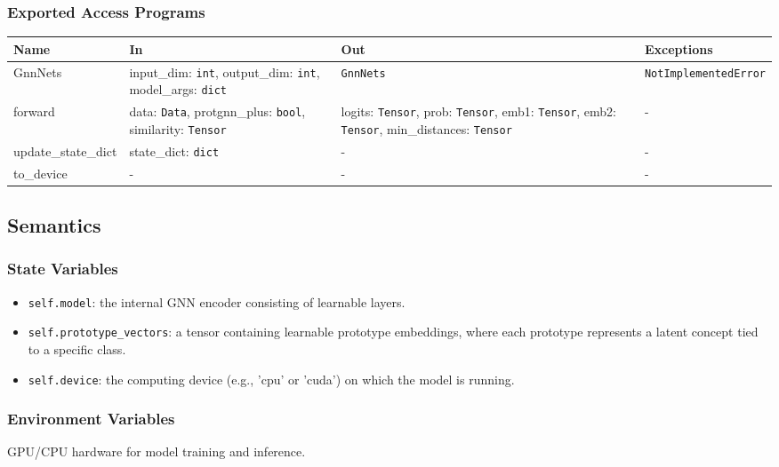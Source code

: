 \documentclass[12pt, titlepage]{article}
\begin{document}
\subsubsection{Exported Access Programs}

\begin{center}
\begin{tabular}{p{3cm} p{4.5cm} p{4.5cm} p{3cm}}
\hline
\textbf{Name} & \textbf{In} & \textbf{Out} & \textbf{Exceptions} \\
\hline
GnnNets & input\_dim: \texttt{int}, output\_dim: \texttt{int}, model\_args: \texttt{dict} & \texttt{GnnNets} & \texttt{NotImplementedError} \\
forward & data: \texttt{Data}, protgnn\_plus: \texttt{bool}, similarity: \texttt{Tensor} & logits: \texttt{Tensor}, prob: \texttt{Tensor}, emb1: \texttt{Tensor}, emb2: \texttt{Tensor}, min\_distances: \texttt{Tensor} & - \\
update\_state\_dict & state\_dict: \texttt{dict} & - & - \\
to\_device & - & - & - \\

\hline
\end{tabular}
\end{center}

\subsection{Semantics}

\subsubsection{State Variables}
\begin{itemize}
  \item \texttt{self.model}: the internal GNN encoder consisting of learnable layers.
  \item \texttt{self.prototype\_vectors}: a tensor containing learnable prototype embeddings, where each prototype represents a latent concept tied to a specific class.
  \item \texttt{self.device}: the computing device (e.g., 'cpu' or 'cuda') on which the model is running.
\end{itemize}

\subsubsection{Environment Variables}
GPU/CPU hardware for model training and inference.
\end{document}
